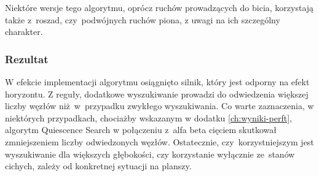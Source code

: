 Niektóre wersje tego algorytmu, oprócz ruchów prowadzących do bicia, korzystają także z~roszad, czy~podwójnych ruchów piona, z uwagi na ich szczególny charakter.

\subsubsection{Rezultat}

W efekcie implementacji algorytmu osiągnięto silnik, który jest odporny na efekt horyzontu.
Z reguły, dodatkowe wyszukiwanie prowadzi do odwiedzenia większej liczby węzłów niż~w~przypadku zwykłego wyszukiwania.
Co warte zaznaczenia, w niektórych przypadkach, chociażby wskazanym w dodatku \ref{ch:wyniki-perft}, algorytm Quiescence Search w połączeniu z~alfa beta cięciem skutkował zmniejszeniem liczby odwiedzonych węzłów.
Ostatecznie, czy~korzystniejszym jest wyszukiwanie dla większych głębokości, czy korzystanie wyłącznie ze~stanów cichych, zależy od konkretnej sytuacji na planszy.